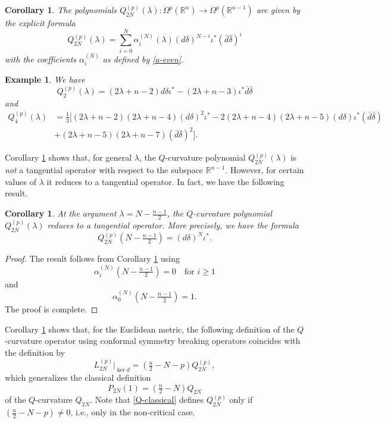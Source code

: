\documentclass[a4paper,12pt,reqno]{amsart}
\newtheorem{cor}[theorem]{Corollary}
\newtheorem{example}[theorem]{Example}
\numberwithin{theorem}{subsection}
\numberwithin{equation}{section}
\begin{document}
\begin{cor}\label{Q-pol} The polynomials $Q_{2N}^{(p)}(\lambda):
\Omega^p({\mathbb{R}}^n) \to \Omega^p({\mathbb{R}}^{n-1})$ are given by the explicit formula
$$
   Q_{2N}^{(p)}(\lambda) = \sum_{i=0}^N \alpha_i^{(N)}(\lambda) ({d}\delta)^{N-i} \iota^* (\bar{d}
   \bar{\delta})^i
$$
with the coefficients $\alpha_i^{(N)}$ as defined by \eqref{a-even}.
\end{cor}

\begin{example} We have
\begin{equation*}
   Q^{(p)}_{2}(\lambda) = (2\lambda\!+\!n\!-\!2) {d} \delta\iota^* -(2\lambda\!+\!n\!-\!3)\iota^*\bar{d}\bar{\delta}
\end{equation*}
and
\begin{align*}
   Q^{(p)}_{4}(\lambda) & = \tfrac 13 \big[(2\lambda\!+\!n\!-\!2)(2\lambda\!+\!n\!-\!4)
   ({d}\delta)^2 \iota^*
   -2(2\lambda\!+\!n\!-\!4)(2\lambda\!+\!n\!-\!5)({d}\delta)\iota^*(\bar{d}\bar{\delta})\\
   & + (2\lambda\!+\!n\!-\!5)(2\lambda\!+\!n\!-\!7)(\bar{d}\bar{\delta})^2\big].
\end{align*}
\end{example}

Corollary \ref{Q-pol} shows that, for general $\lambda$, the $Q$-curvature
polynomial $Q^{(p)}_{2N}(\lambda)$ is {\em not} a tangential operator with
respect to the subspace ${\mathbb{R}}^{n-1}$. However, for certain values of $\lambda$ it
reduces to a tangential operator. In fact, we have the following result.

\begin{cor}\label{TangQPoly} At the argument $\lambda=N-\frac{n-1}{2}$,
the $Q$-curvature polynomial $Q^{(p)}_{2N}(\lambda)$ reduces to a tangential
operator. More precisely, we have the formula
$$
   Q_{2N}^{(p)}(N-\tfrac{n-1}{2}) = ({d}\delta)^N \iota^*.
$$
\end{cor}

\begin{proof} The result follows from Corollary \ref{Q-pol} using
$$
\alpha_i^{(N)}(N-\tfrac{n-1}{2})=0 \quad \mbox{for $i \ge 1$}
$$
and
$$
\alpha_0^{(N)}(N-\tfrac{n-1}{2})=1.
$$
The proof is complete.
\end{proof}

Corollary \ref{TangQPoly} shows that, for the Euclidean metric, the following
definition of the $Q$-curvature operator using conformal symmetry breaking
operators coincides with the definition by
\begin{equation}\label{Q-classical}
L_{2N}^{(p)}|_{\ker {d}} = (\tfrac{n}{2}\!-\!N\!-\!p) Q_{2N}^{(p)},
\end{equation}
which generalizes the classical definition
$$
P_{2N}(1) = (\tfrac{n}{2}\!-\!N) Q_{2N}
$$
of the $Q$-curvature $Q_{2N}$. Note that \eqref{Q-classical} defines
$Q_{2N}^{(p)}$ only if $(\tfrac{n}{2}\!-\!N\!-\!p) \ne 0$, i.e., only in the
non-critical case.
\end{document}
